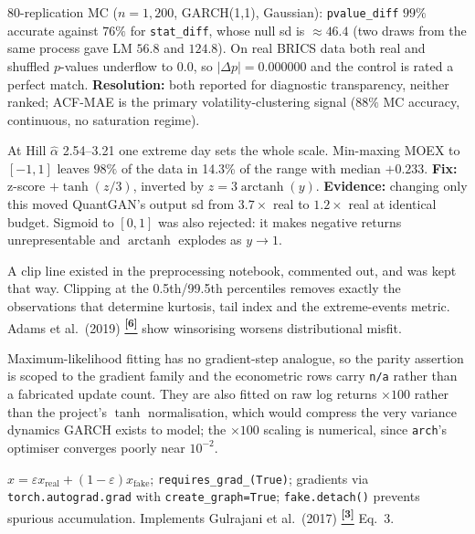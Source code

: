 \documentclass[10pt]{article}
\newcommand{\auditrow}[5]{%
  \begin{tcolorbox}[mybox={#2}{#3},
    title={\textbf{[#1]}\quad #4},
    before skip=4pt, after skip=4pt, breakable]
  \small #5
  \end{tcolorbox}}
\newcommand{\tcite}[1]{%
  \hyperlink{R:#1}{\textsuperscript{\scriptsize\textbf{[#1]}}}}
\begin{document}
\auditrow{REVISED}{Amber}{ABg}%
  {Both ARCH-LM variants demoted to descriptive; neither reliable across regimes}%
  {80-replication MC ($n=1{,}200$, GARCH(1,1), Gaussian): \texttt{pvalue\_diff} $99\%$ accurate against $76\%$ for \texttt{stat\_diff}, whose null sd is $\approx46.4$ (two draws from the same process gave LM $56.8$ and $124.8$). On real BRICS data both real and shuffled $p$-values underflow to $0.0$, so $|\Delta p| = 0.000000$ and the control is rated a perfect match. \textbf{Resolution:} both reported for diagnostic transparency, neither ranked; ACF-MAE is the primary volatility-clustering signal ($88\%$ MC accuracy, continuous, no saturation regime).}

\auditrow{FIXED}{Amber}{ABg}%
  {Min-max normalisation gave the generator an offset to learn before any dynamics}%
  {At Hill $\hat\alpha$ 2.54--3.21 one extreme day sets the whole scale. Min-maxing MOEX to $[-1,1]$ leaves $98\%$ of the data in 14.3\% of the range with median \(+0.233\). \textbf{Fix:} z-score $+\tanh(z/3)$, inverted by $z=3\operatorname{arctanh}(y)$. \textbf{Evidence:} changing only this moved QuantGAN's output sd from $3.7\times$ real to $1.2\times$ real at identical budget. Sigmoid to $[0,1]$ was also rejected: it makes negative returns unrepresentable and $\operatorname{arctanh}$ explodes as $y\to1$.}

\auditrow{DECISION}{Indigo}{IBg}%
  {No outlier clipping on log returns --- deliberate}%
  {A clip line existed in the preprocessing notebook, commented out, and was kept that way. Clipping at the 0.5th/99.5th percentiles removes exactly the observations that determine kurtosis, tail index and the extreme-events metric. Adams et al.\ (2019)\tcite{6} show winsorising worsens distributional misfit.}

\auditrow{DECISION}{Indigo}{IBg}%
  {Econometric models exempt from budget parity, and fitted on raw returns}%
  {Maximum-likelihood fitting has no gradient-step analogue, so the parity assertion is scoped to the gradient family and the econometric rows carry \texttt{n/a} rather than a fabricated update count. They are also fitted on raw log returns $\times100$ rather than the project's $\tanh$ normalisation, which would compress the very variance dynamics GARCH exists to model; the $\times100$ scaling is numerical, since \texttt{arch}'s optimiser converges poorly near $10^{-2}$.}

\auditrow{OK}{FGreen}{GBg}%
  {WGAN-GP gradient penalty is correct (QuantGAN \& CNN-WGAN-GP)}%
  {$\hat x = \varepsilon x_\text{real} + (1-\varepsilon)x_\text{fake}$; \texttt{requires\_grad\_(True)}; gradients via \texttt{torch.autograd.grad} with \texttt{create\_graph=True}; \texttt{fake.detach()} prevents spurious accumulation. Implements Gulrajani et al.\ (2017)\tcite{3} Eq.~3.}
\end{document}
